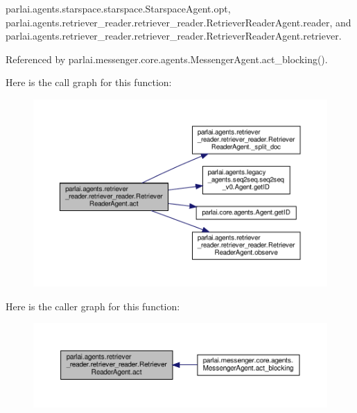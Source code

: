 parlai.\+agents.\+starspace.\+starspace.\+Starspace\+Agent.\+opt, parlai.\+agents.\+retriever\+\_\+reader.\+retriever\+\_\+reader.\+Retriever\+Reader\+Agent.\+reader, and parlai.\+agents.\+retriever\+\_\+reader.\+retriever\+\_\+reader.\+Retriever\+Reader\+Agent.\+retriever.



Referenced by parlai.\+messenger.\+core.\+agents.\+Messenger\+Agent.\+act\+\_\+blocking().

Here is the call graph for this function\+:
\nopagebreak
\begin{figure}[H]
\begin{center}
\leavevmode
\includegraphics[width=350pt]{classparlai_1_1agents_1_1retriever__reader_1_1retriever__reader_1_1RetrieverReaderAgent_a26f155f699b7a345b3f995b09e049a97_cgraph}
\end{center}
\end{figure}
Here is the caller graph for this function\+:
\nopagebreak
\begin{figure}[H]
\begin{center}
\leavevmode
\includegraphics[width=350pt]{classparlai_1_1agents_1_1retriever__reader_1_1retriever__reader_1_1RetrieverReaderAgent_a26f155f699b7a345b3f995b09e049a97_icgraph}
\end{center}
\end{figure}
\mbox{\label{classparlai_1_1agents_1_1retriever__reader_1_1retriever__reader_1_1RetrieverReaderAgent_aa2c30c066bf3cf8413fd7fbc4d7de0e1}} 
